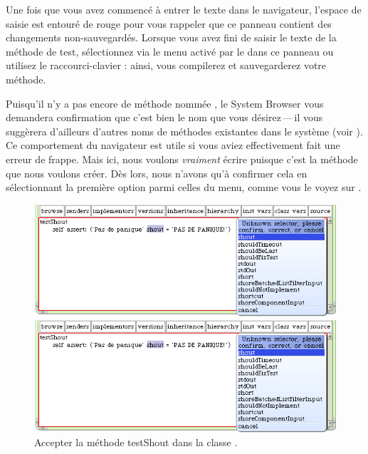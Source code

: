 \documentclass[a4paper,10pt,twoside]{book}
\begin{document}
Une fois que vous avez commenc\'e \`a entrer le texte dans le
navigateur, l'espace de saisie est entour\'e de rouge pour vous
rappeler que ce panneau contient des changements non-sauvegard\'es.
Lorsque vous avez fini de saisir le texte de la m\'ethode de test,
s\'electionnez  via le menu activ\'e par le
 dans ce panneau ou utilisez le raccourci-clavier
: ainsi, vous compilerez et sauvegarderez votre m\'ethode.

Puisqu'il n'y a pas encore de m\'ethode nomm\'ee , le System
Browser vous demandera confirmation que c'est bien le nom que vous
d\'esirez\,---\,il vous sugg\`erera d'ailleurs d'autres noms de
m\'ethodes existantes dans le syst\`eme (voir ).
Ce comportement du navigateur est utile si vous aviez effectivement
fait une erreur de frappe. Mais ici, nous voulons \emph{vraiment}
\'ecrire  puisque c'est la m\'ethode que nous voulons
cr\'eer. D\`es lors, nous n'avons qu'\`a confirmer cela en
s\'electionnant la premi\`ere option parmi celles du menu, comme vous
le voyez sur . 

\begin{figure}[hbt]
\ifluluelse
	{\centerline {\includegraphics[width=\textwidth]{testShoutConfirm}}}
	{\centerline {\includegraphics[scale=0.7]{testShoutConfirm}}}
\caption{Accepter la m\'ethode testShout dans la classe .
\label{fig:testShoutConfirm}}
\end{figure}
\end{document}
